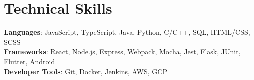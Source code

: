 \documentclass[letterpaper,11pt]{article}
\begin{document}
\section{Technical Skills}
 \begin{itemize}[leftmargin=0.15in, label={}]
    \small{\item{
     \textbf{Languages}{: JavaScript, TypeScript, Java, Python, C/C++, SQL, HTML/CSS, SCSS} \\
     \textbf{Frameworks}{: React, Node.js, Express, Webpack, Mocha, Jest, Flask, JUnit, Flutter, Android} \\
     \textbf{Developer Tools}{: Git, Docker, Jenkins, AWS, GCP} \\
    }}
 \end{itemize}

\end{document}
